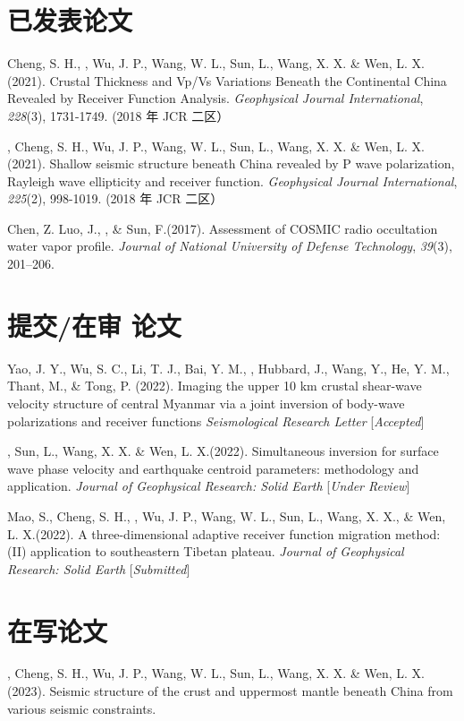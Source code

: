 \newcommand{\Revision}{\textit{under revision}}
\newcommand{\CS}{*} %
\newcommand{\CF}{\textsuperscript{\#}} %


\section*{已发表论文}

\begin{etaremune}
\item
    Cheng, S. H., \Xiao, Wu, J. P., Wang, W. L., Sun, L., Wang, X. X. \& Wen, L. X.(2021).
    Crustal Thickness and Vp/Vs Variations Beneath the Continental China Revealed by Receiver Function Analysis.
    \textit{Geophysical Journal International}, \textit{228}(3), 1731-1749.  (2018 年 JCR 二区）
\item
    \Xiao, Cheng, S. H., Wu, J. P., Wang, W. L., Sun, L., Wang, X. X. \& Wen, L. X.(2021).
    Shallow seismic structure beneath China revealed by P wave polarization, Rayleigh wave ellipticity and receiver function.
    \textit{Geophysical Journal International}, \textit{225}(2), 998-1019.  (2018 年 JCR 二区）
\item
    Chen, Z. Luo, J.,  \Xiao, \& Sun, F.(2017).
    Assessment of COSMIC radio occultation water vapor profile.
    \textit{Journal of National University of Defense Technology}, \textit{39}(3), 201--206. 
\end{etaremune}

\section*{提交/在审 论文}
\begin{etaremune}
\item
    Yao, J. Y., Wu, S. C., Li, T. J., Bai, Y. M., \Xiao, Hubbard, J., Wang, Y., He, Y. M., Thant, M., \& Tong, P. (2022).
    Imaging the upper 10 km crustal shear-wave velocity structure of central Myanmar via a joint inversion of body-wave polarizations and receiver functions
    \textit{Seismological Research Letter} [\textit{Accepted}]
\item
    \Xiao, Sun, L., Wang, X. X. \& Wen, L. X.(2022).
    Simultaneous inversion for surface wave phase velocity and earthquake centroid parameters: methodology and application.
    \textit{Journal of Geophysical Research: Solid Earth} [\textit{Under Review}]
\item
    Mao, S., Cheng, S. H., \Xiao, Wu, J. P., Wang, W. L., Sun, L., Wang, X. X., \& Wen, L. X.(2022).
    A three-dimensional adaptive receiver function migration method: (II) application to southeastern Tibetan plateau.
    \textit{Journal of Geophysical Research: Solid Earth} [\textit{Submitted}]
\end{etaremune}

\section*{在写论文}
\begin{etaremune}
\item
    \Xiao, Cheng, S. H., Wu, J. P., Wang, W. L., Sun, L., Wang, X. X. \& Wen, L. X.(2023).
    Seismic structure of the crust and uppermost mantle beneath China from various seismic constraints.
\end{etaremune}

